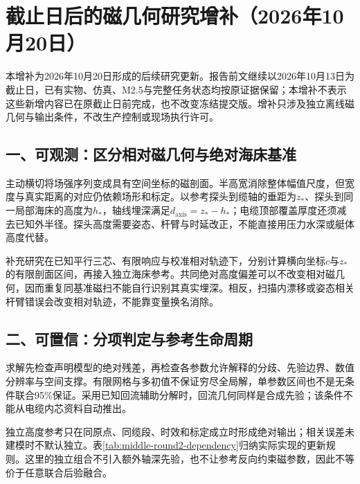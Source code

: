 \clearpage
\chapter*{截止日后的磁几何研究增补（2026年10月20日）}
\renewcommand{\thetable}{增补\arabic{table}}
\setcounter{table}{0}

本增补为2026年10月20日形成的后续研究更新。报告前文继续以2026年10月13日为截止日，已有实物、仿真、M2.5与完整任务状态均按原证据保留；本增补不表示这些新增内容已在原截止日前完成，也不改变冻结提交版。增补只涉及独立离线磁几何与输出条件，不改生产控制或现场执行许可。

\section*{一、可观测：区分相对磁几何与绝对海床基准}

主动横切将场强序列变成具有空间坐标的磁剖面。半高宽消除整体幅值尺度，但宽度与真实距离的对应仍依赖场形和标定。以参考探头到缆轴的垂距为$z_*$、探头到同一局部海床的高度为$h_*$，轴线埋深满足$d_{\mathrm{axis}}=z_*-h_*$；电缆顶部覆盖厚度还须减去已知外半径。探头高度需要姿态、杆臂与时延改正，不能直接用压力水深或艇体高度代替。

补充研究在已知平行三芯、有限响应与校准相对轨迹下，分别计算横向坐标$c$与$z_*$的有限剖面区间，再接入独立海床参考。共同绝对高度偏差可以不改变相对磁几何，因而重复同基准磁扫不能自行识别其真实埋深。相反，扫描内漂移或姿态相关杆臂错误会改变相对轨迹，不能靠变量换名消除。

\section*{二、可置信：分项判定与参考生命周期}

求解先检查声明模型的绝对残差，再检查各参数允许解释的分歧、先验边界、数值分辨率与空间支撑。有限网格与多初值不保证穷尽全局解，单参数区间也不是无条件联合95\%保证。采用已知回流辅助分解时，回流几何同样是合成先验；该条件不能从电缆内芯资料自动推出。

独立高度参考只在同原点、同缆段、时效和标定成立时形成绝对输出；相关误差未建模时不默认独立。表\ref{tab:middle-round2-dependency}归纳实际实现的更新规则。这里的独立组合不引入额外轴深先验，也不让参考反向约束磁参数，因此不等价于任意联合后验融合。

